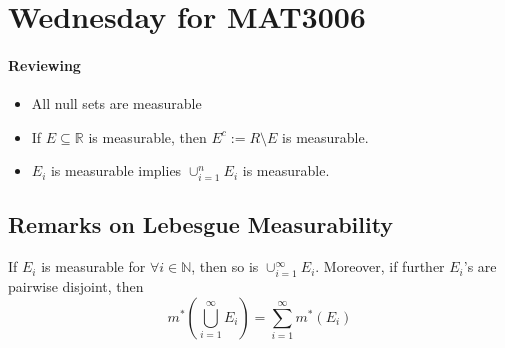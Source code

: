 
\section{Wednesday for MAT3006}
\paragraph{Reviewing}
\begin{itemize}
\item
All null sets are measurable
\item
If $E\subseteq \mathbb{R}$ is measurable, then $E^c:=R\setminus E$ is measurable.
\item
$E_i$ is measurable implies $\cup_{i=1}^nE_i$ is measurable. 
\end{itemize}
\subsection{Remarks on Lebesgue Measurability}
\begin{proposition}
If $E_i$ is measurable for $\forall i\in\mathbb{N}$, then so is $\cup_{i=1}^\infty E_i$.
Moreover, if further $E_i$'s are pairwise disjoint, then
\[
m^*\left(\bigcup_{i=1}^\infty E_i\right)
=
\sum_{i=1}^\infty m^*(E_i)
\]
\end{proposition}
